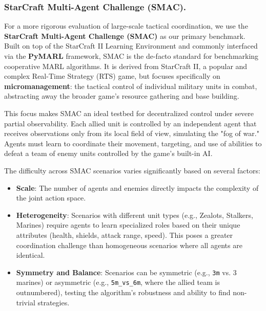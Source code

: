 \documentclass[../Main.tex]{subfiles}
\begin{document}
\subsubsection{StarCraft Multi-Agent Challenge (SMAC).}
For a more rigorous evaluation of large-scale tactical coordination, we use the \textbf{StarCraft Multi-Agent Challenge (SMAC)} as our primary benchmark. Built on top of the StarCraft II Learning Environment and commonly interfaced via the \textbf{PyMARL} framework, SMAC is the de-facto standard for benchmarking cooperative MARL algorithms. It is derived from StarCraft II, a popular and complex Real-Time Strategy (RTS) game, but focuses specifically on \textbf{micromanagement}: the tactical control of individual military units in combat, abstracting away the broader game's resource gathering and base building.

This focus makes SMAC an ideal testbed for decentralized control under severe partial observability. Each allied unit is controlled by an independent agent that receives observations only from its local field of view, simulating the "fog of war." Agents must learn to coordinate their movement, targeting, and use of abilities to defeat a team of enemy units controlled by the game's built-in AI.

The difficulty across SMAC scenarios varies significantly based on several factors:
\begin{itemize}
    \item \textbf{Scale}: The number of agents and enemies directly impacts the complexity of the joint action space.
    \item \textbf{Heterogeneity}: Scenarios with different unit types (e.g., Zealots, Stalkers, Marines) require agents to learn specialized roles based on their unique attributes (health, shields, attack range, speed). This poses a greater coordination challenge than homogeneous scenarios where all agents are identical.
    \item \textbf{Symmetry and Balance}: Scenarios can be symmetric (e.g., \texttt{3m} vs. 3 marines) or asymmetric (e.g., \texttt{5m\_vs\_6m}, where the allied team is outnumbered), testing the algorithm's robustness and ability to find non-trivial strategies.
\end{itemize}
\end{document}
